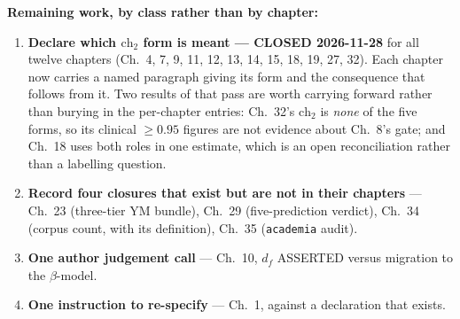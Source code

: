 \noindent \textbf{Remaining work, by class rather than by chapter:}
\begin{enumerate}
\item \textbf{Declare which $\mathrm{ch}_2$ form is meant --- CLOSED
2026-11-28} for all twelve chapters (Ch.~4, 7, 9, 11, 12, 13, 14, 15, 18, 19,
27, 32). Each chapter now carries a named paragraph giving its form and the
consequence that follows from it. Two results of that pass are worth carrying
forward rather than burying in the per-chapter entries: Ch.~32's
$\mathrm{ch}_2$ is \emph{none} of the five forms, so its clinical
$\geq 0.95$ figures are not evidence about Ch.~8's gate; and Ch.~18 uses both
roles in one estimate, which is an open reconciliation rather than a
labelling question.
\item \textbf{Record four closures that exist but are not in their chapters}
--- Ch.~23 (three-tier YM bundle), Ch.~29 (five-prediction verdict), Ch.~34
(corpus count, with its definition), Ch.~35 (\texttt{academia} audit).
\item \textbf{One author judgement call} --- Ch.~10, $d_f$ ASSERTED versus
migration to the $\beta$-model.
\item \textbf{One instruction to re-specify} --- Ch.~1, against a declaration
that exists.
\end{enumerate}
